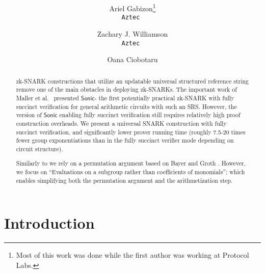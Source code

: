\documentclass[11pt]{article} %
\title{ \bf \papertitle \\[0.72cm]}
\author{ Ariel Gabizon\thanks{Most of this work was done while the first author was working at Protocol Labs.}\\ \tt{Aztec}  \and Zachary J. Williamson\\ \tt{Aztec} \and Oana Ciobotaru}
\newcommand{\sonic}{\ensuremath{\mathsf{Sonic}}\xspace}
\begin{document}
    \maketitle

\begin{abstract}
	zk-SNARK constructions that utilize an updatable universal structured reference string remove one of the main obstacles in deploying zk-SNARKs\cite{firstUniversal}. The important work of Maller et al.\ \cite{sonic} presented \sonic\;- the first potentially practical zk-SNARK with fully succinct verification for general arithmetic circuits with such an SRS.
	However, the version of \sonic enabling fully succinct verification still requires relatively high proof construction overheads. We present a universal SNARK construction with fully succinct verification, and significantly lower prover running time (roughly 7.5-20 times fewer group exponentiations than \cite{sonic} in the fully succinct verifier mode depending on circuit structure).
	
	Similarly to \cite{sonic} we rely on a permutation argument based on Bayer and Groth \cite{permorig}. However, we focus on ``Evaluations on a subgroup rather than coefficients of monomials''; which enables simplifying both the permutation argument and the arithmetization step.
\end{abstract}

\section{Introduction}
% 
% 
% 
% 
% 
% 
\end{document}
